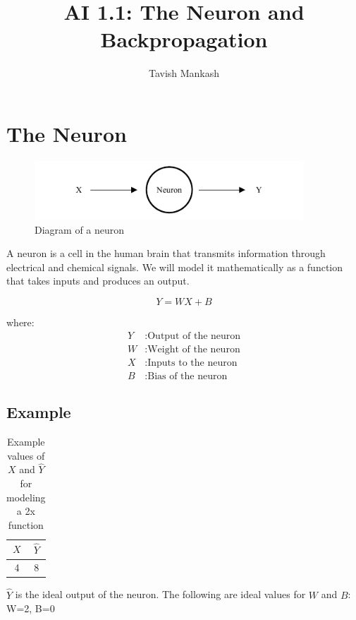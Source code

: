 \documentclass[12pt,a4paper]{article}
\title{AI 1.1: The Neuron and Backpropagation}
\author{Tavish Mankash}
\date{}
\begin{document}
\maketitle

\section{The Neuron}
\begin{figure}[ht]
    \centering
    \includegraphics[width=0.9\textwidth]{figs/Neuron.drawio.pdf}
    \caption{Diagram of a neuron}
    \label{fig:neuron}
\end{figure}

A neuron is a cell in the human brain that transmits information through electrical and chemical signals. We will model it mathematically as a function that takes inputs and produces an output.

\[
Y = WX + B
\]

where:
\[
\begin{aligned}
    Y & : \text{Output of the neuron} \\
    W & : \text{Weight of the neuron} \\
    X & : \text{Inputs to the neuron} \\
    B & : \text{Bias of the neuron}
\end{aligned}
\]

\subsection{Example}
\begin{table}[ht]
    \centering
    \begin{tabular}{|c|c|}
        \hline
        $X$ & $\hat{Y}$ \\ \hline
        4   & 8         \\ \hline
    \end{tabular}
    \caption{Example values of $X$ and $\hat{Y}$ for modeling a 2x function}
    \label{tab:example}
\end{table}


$\hat{Y}$ is the ideal output of the neuron.
The following are ideal values for $W$ and $B$:
W=2, B=0
\end{document}
